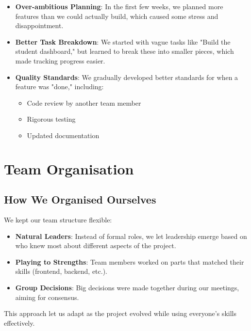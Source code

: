 \begin{itemize}
    \item \textbf{Over-ambitious Planning}: In the first few weeks, we planned more features than we could actually build, which caused some stress and disappointment.
    
    \item \textbf{Better Task Breakdown}: We started with vague tasks like "Build the student dashboard," but learned to break these into smaller pieces, which made tracking progress easier.
    
    \item \textbf{Quality Standards}: We gradually developed better standards for when a feature was "done," including:
    \begin{itemize}
        \item Code review by another team member
        \item Rigorous testing
        \item Updated documentation
    \end{itemize}
\end{itemize}

\section{Team Organisation}

\subsection{How We Organised Ourselves}

We kept our team structure flexible:

\begin{itemize}
    \item \textbf{Natural Leaders}: Instead of formal roles, we let leadership emerge based on who knew most about different aspects of the project.
    
    \item \textbf{Playing to Strengths}: Team members worked on parts that matched their skills (frontend, backend, etc.).
    
    \item \textbf{Group Decisions}: Big decisions were made together during our meetings, aiming for consensus.
\end{itemize}

This approach let us adapt as the project evolved while using everyone's skills effectively.

